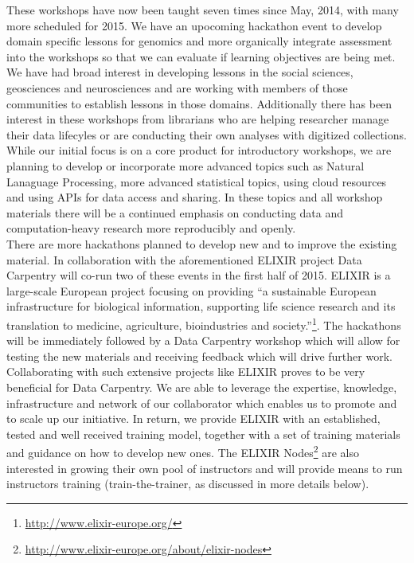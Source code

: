 \documentclass[15]{idcc}
\begin{document}
\begin{itemize}
These workshops have now been taught seven times since May, 2014, with many more scheduled for 2015. We have an
  upocoming hackathon event to develop domain specific lessons for genomics and more organically integrate assessment
  into the workshops so that we can evaluate if learning objectives are being met. We have had broad interest in developing lessons
  in the social sciences, geosciences and neurosciences and are working with members of those communities to establish lessons in those
  domains. Additionally there has been interest in these workshops from librarians who are helping researcher manage their data lifecyles
 or are conducting their own analyses with digitized collections.\\

 While our initial focus is on a core product for introductory workshops, we are planning to develop or incorporate more advanced topics
 such as Natural Lanaguage Processing, more advanced statistical topics, using cloud resources and using APIs for data access and sharing. In these topics and all workshop materials there will be a continued emphasis on conducting data and computation-heavy research more reproducibly and openly.\\

There are  more hackathons planned to develop new and to improve the existing material. In collaboration with the aforementioned ELIXIR project  Data Carpentry will co-run two 
of these events in the first half of 2015. ELIXIR is a large-scale European project focusing on providing ``a sustainable European infrastructure for biological information, 
supporting life science research and its translation to medicine, agriculture, bioindustries and society.''\footnote{\url{http://www.elixir-europe.org/}}. 
The hackathons will be immediately followed by a Data Carpentry workshop which will allow for testing the new materials and receiving feedback which will
drive further work. Collaborating with such extensive projects like ELIXIR proves to be very beneficial for Data Carpentry. We are able to leverage
the expertise, knowledge, infrastructure and network of our collaborator which enables us to promote and to scale up our initiative. In return, we provide ELIXIR with 
an established, tested and well received training model, together with a set of training materials and guidance on how to develop new ones. The ELIXIR 
Nodes\footnote{\url{http://www.elixir-europe.org/about/elixir-nodes}} are also interested in growing their own pool of instructors and will provide means
to run instructors training (train-the-trainer, as discussed in more details below). \\


\end{itemize}
\end{document}
